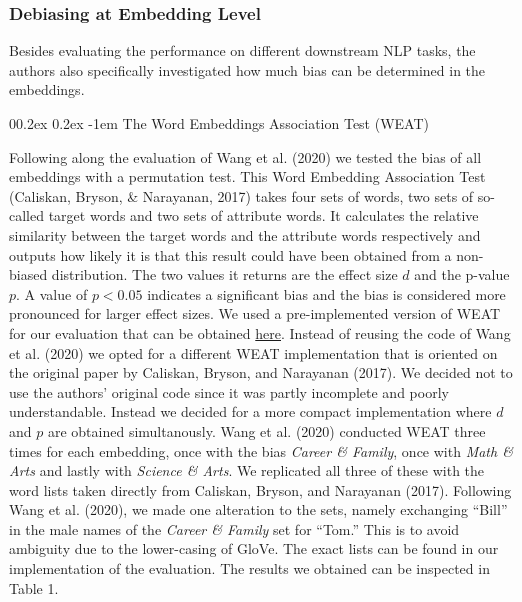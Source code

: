 \documentclass[
  english,
  man,floatsintext]{apa6}
\makeatletter
\let\oldparagraph\paragraph
\renewcommand{\paragraph}[1]{\oldparagraph{#1}\mbox{}}
\renewcommand{\paragraph}{\@startsection{paragraph}{4}{\parindent}%
  {0\baselineskip \@plus 0.2ex \@minus 0.2ex}%
  {-1em}%
  {\normalfont\normalsize\bfseries\itshape\typesectitle}}
\makeatother
\begin{document}
\hypertarget{debiasing-at-embedding-level}{%
\subsubsection{Debiasing at Embedding Level}\label{debiasing-at-embedding-level}}

Besides evaluating the performance on different downstream NLP tasks, the authors also specifically investigated how much bias can be determined in the embeddings.

\hypertarget{the-word-embeddings-association-test-weat}{%
\paragraph{The Word Embeddings Association Test (WEAT)}\label{the-word-embeddings-association-test-weat}}

Following along the evaluation of Wang et al. (2020) we tested the bias of all embeddings with a permutation test. This Word Embedding Association Test (Caliskan, Bryson, \& Narayanan, 2017) takes four sets of words, two sets of so-called target words and two sets of attribute words. It calculates the relative similarity between the target words and the attribute words respectively and outputs how likely it is that this result could have been obtained from a non-biased distribution. The two values it returns are the effect size \(d\) and the p-value \(p\). A value of \(p<0.05\) indicates a significant bias and the bias is considered more pronounced for larger effect sizes.
We used a pre-implemented version of WEAT for our evaluation that can be obtained \href{https://github.com/shivaomrani/HumanBiasInSemantics}{here}. Instead of reusing the code of Wang et al. (2020) we opted for a different WEAT implementation that is oriented on the original paper by Caliskan, Bryson, and Narayanan (2017). We decided not to use the authors' original code since it was partly incomplete and poorly understandable. Instead we decided for a more compact implementation where \(d\) and \(p\) are obtained simultanously.
Wang et al. (2020) conducted WEAT three times for each embedding, once with the bias \emph{Career \& Family}, once with \emph{Math \& Arts} and lastly with \emph{Science \& Arts}. We replicated all three of these with the word lists taken directly from Caliskan, Bryson, and Narayanan (2017). Following Wang et al. (2020), we made one alteration to the sets, namely exchanging ``Bill'' in the male names of the \emph{Career \& Family} set for ``Tom.'' This is to avoid ambiguity due to the lower-casing of GloVe. The exact lists can be found in our implementation of the evaluation.
The results we obtained can be inspected in Table 1.
\end{document}
